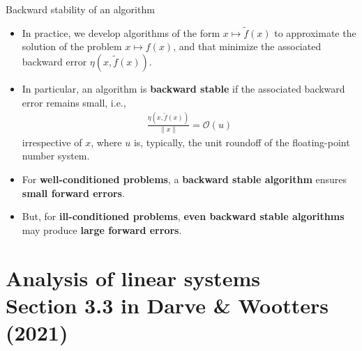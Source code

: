 \documentclass[t,usepdftitle=false]{beamer}
\begin{document}
\begin{frame}{Backward stability of an algorithm}
\begin{itemize}
\item In practice, we develop algorithms of the form $x\mapsto\tilde{f}(x)$ to approximate the solution of the problem $x\mapsto f(x)$, and that minimize the associated backward error $\eta(x,\tilde{f}(x))$.
\item In particular, an algorithm is \textbf{backward stable} if the associated backward error remains small, i.e.,
\begin{align*}
\frac{\eta(x,\tilde{f}(x))}{\|x\|} =\mathcal{O}(u)
\end{align*}
irrespective of $x$, where $u$ is, typically, the unit roundoff of the floating-point number system.
\item For \textbf{well-conditioned problems}, a \textbf{backward stable algorithm} ensures \textbf{small forward errors}.
\item But, for \textbf{ill-conditioned problems}, \textbf{even backward stable algorithms} may produce \textbf{large forward errors}.
\end{itemize}
\end{frame}

\section{Analysis of linear systems\\{\small Section 3.3 in Darve \& Wootters (2021)}}
\end{document}
